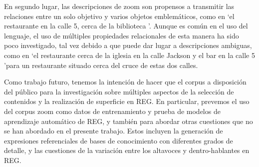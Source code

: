 En segundo lugar, las descripciones de zoom son propensos a transmitir las relaciones entre un solo objetivo y varios objetos emblem\'aticos, como en `el restaurante en la calle 5, cerca de la biblioteca '. Aunque es com\'un en el uso del lenguaje, el uso de m\'ultiples propiedades relacionales de esta manera ha sido poco investigado, tal vez debido a que puede dar lugar a descripciones ambiguas, como en `el restaurante cerca de la iglesia en la calle Jackson y el bar en la calle 5 'para un restaurante situado cerca del cruce de estas dos calles.

Como trabajo futuro, tenemos la intenci\'on de hacer que el corpus a disposici\'on del p\'ublico para la investigaci\'on sobre m\'ultiples aspectos de la selecci\'on de contenidos y la realizaci\'on de superficie en REG. En particular, prevemos el uso del corpus zoom como datos de entrenamiento y prueba de modelos de aprendizaje autom\'atico de REG, y tambi\'en para abordar otras cuestiones que no se han abordado en el presente trabajo. Estos incluyen la generaci\'on de expresiones referenciales de bases de conocimiento con diferentes grados de detalle, y las cuestiones de la variaci\'on entre los altavoces y dentro-hablantes en REG.

